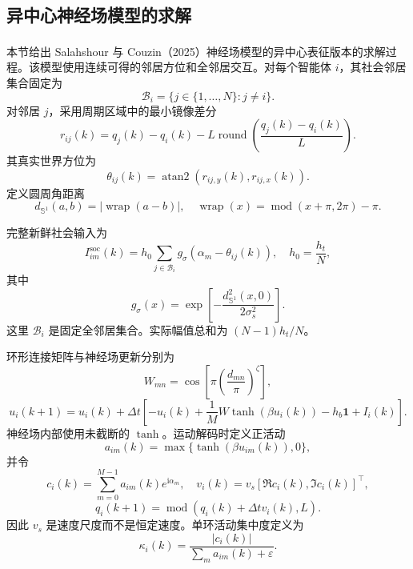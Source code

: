 \documentclass[UTF8,fontset=windows,11pt]{ctexart}
\newcommand{\upcite}[1]{\textsuperscript{\cite{#1}}}
\begin{document}
\subsection{异中心神经场模型的求解}

本节给出 Salahshour 与 Couzin（2025）神经场模型的异中心表征版本\upcite{Salahshour2025}的求解过程。该模型使用连续可得的邻居方位和全邻居交互。对每个智能体 $i$，其社会邻居集合固定为
\begin{equation}
 \mathcal B_i=\{j\in\{1,\ldots,N\}:j\ne i\}.
\end{equation}
对邻居 $j$，采用周期区域中的最小镜像差分
\begin{equation}
 r_{ij}(k)=q_j(k)-q_i(k)-L\operatorname{round}\left(\frac{q_j(k)-q_i(k)}{L}\right).
\end{equation}
其真实世界方位为
\begin{equation}
 \theta_{ij}(k)=\operatorname{atan2}(r_{ij,y}(k),r_{ij,x}(k)).
\end{equation}
定义圆周角距离
\begin{equation}
 d_{\mathbb S^1}(a,b)=\left|\operatorname{wrap}(a-b)\right|,
\quad \operatorname{wrap}(x)=\operatorname{mod}(x+\pi,2\pi)-\pi.
\end{equation}

完整新鲜社会输入为
\begin{equation}
 I^{\mathrm{soc}}_{im}(k)=h_0\sum_{j\in\mathcal B_i}
 g_\sigma\left(\alpha_m-\theta_{ij}(k)\right),
 \quad h_0=\frac{h_t}{N},
\end{equation}
其中
\begin{equation}
 g_\sigma(x)=\exp\left[-\frac{d_{\mathbb S^1}^2(x,0)}{2\sigma_s^2}\right].
\end{equation}
这里 $\mathcal B_i$ 是固定全邻居集合。实际幅值总和为 $(N-1)h_t/N$。

环形连接矩阵与神经场更新分别为
\begin{equation}
 W_{mn}=\cos\left[\pi\left(\frac{d_{mn}}{\pi}\right)^\zeta\right],
\end{equation}
\begin{equation}
 u_i(k+1)=u_i(k)+\Delta t\left[-u_i(k)+\frac{1}{M}W\tanh(\beta u_i(k))-h_b\bm 1+I_i(k)\right].
\end{equation}
神经场内部使用未截断的 $\tanh$。运动解码时定义正活动
\begin{equation}
 a_{im}(k)=\max\{\tanh(\beta u_{im}(k)),0\},
\end{equation}
并令
\begin{equation}
 c_i(k)=\sum_{m=0}^{M-1}a_{im}(k)e^{\mathrm i\alpha_m},
\quad
 v_i(k)=v_s[\Re c_i(k),\Im c_i(k)]^\top,
\end{equation}
\begin{equation}
 q_i(k+1)=\operatorname{mod}(q_i(k)+\Delta t v_i(k),L).
\end{equation}
因此 $v_s$ 是速度尺度而不是恒定速度。单环活动集中度定义为
\begin{equation}
 \kappa_i(k)=\frac{|c_i(k)|}{\sum_m a_{im}(k)+\varepsilon}.
\end{equation}
\end{document}

